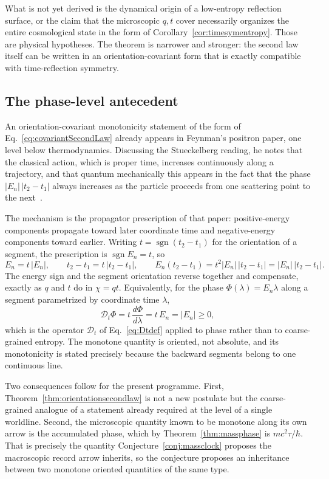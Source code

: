 \documentclass[11pt]{article}
\newcommand{\sgn}{\operatorname{sgn}}
\theoremstyle{definition}\newtheorem{definition}[theorem]{Definition}
\theoremstyle{remark}\newtheorem{remark}[theorem]{Remark}\newtheorem{conjecture}[theorem]{Conjecture}
\begin{document}
What is not yet derived is the dynamical origin of a low-entropy reflection surface, or the claim that the microscopic $q,t$ cover necessarily organizes the entire cosmological state in the form of Corollary~\ref{cor:timesymentropy}. Those are physical hypotheses. The theorem is narrower and stronger: the second law itself can be written in an orientation-covariant form that is exactly compatible with time-reflection symmetry.

\subsection{The phase-level antecedent}\label{subsec:feynmanphase}
An orientation-covariant monotonicity statement of the form of Eq.~\eqref{eq:covariantSecondLaw} already appears in Feynman's positron paper, one level below thermodynamics. Discussing the Stueckelberg reading, he notes that the classical action, which is proper time, increases continuously along a trajectory, and that quantum mechanically this appears in the fact that the phase $|E_n|\,|t_2-t_1|$ always increases as the particle proceeds from one scattering point to the next~\cite{Feynman1949}.

The mechanism is the propagator prescription of that paper: positive-energy components propagate toward later coordinate time and negative-energy components toward earlier. Writing $t=\sgn(t_2-t_1)$ for the orientation of a segment, the prescription is $\sgn E_n=t$, so
\begin{equation}\label{eq:feynmanphasemonotone}
 E_n=t\,|E_n|,\qquad t_2-t_1=t\,|t_2-t_1|,\qquad
 \boxed{E_n(t_2-t_1)=t^2|E_n|\,|t_2-t_1|=|E_n|\,|t_2-t_1|.}
\end{equation}
The energy sign and the segment orientation reverse together and compensate, exactly as $q$ and $t$ do in $\chi=qt$. Equivalently, for the phase $\Phi(\lambda)=E_n\lambda$ along a segment parametrized by coordinate time $\lambda$,
\begin{equation}\label{eq:feynmanDt}
 \boxed{\mathscr D_t\Phi=t\,\frac{d\Phi}{d\lambda}=t\,E_n=|E_n|\ge0,}
\end{equation}
which is the operator $\mathscr D_t$ of Eq.~\eqref{eq:Dtdef} applied to phase rather than to coarse-grained entropy. The monotone quantity is oriented, not absolute, and its monotonicity is stated precisely because the backward segments belong to one continuous line.

Two consequences follow for the present programme. First, Theorem~\ref{thm:orientationsecondlaw} is not a new postulate but the coarse-grained analogue of a statement already required at the level of a single worldline. Second, the microscopic quantity known to be monotone along its own arrow is the accumulated phase, which by Theorem~\ref{thm:massphase} is $mc^2\tau/\hbar$. That is precisely the quantity Conjecture~\ref{conj:massclock} proposes the macroscopic record arrow inherits, so the conjecture proposes an inheritance between two monotone oriented quantities of the same type.
\end{document}
